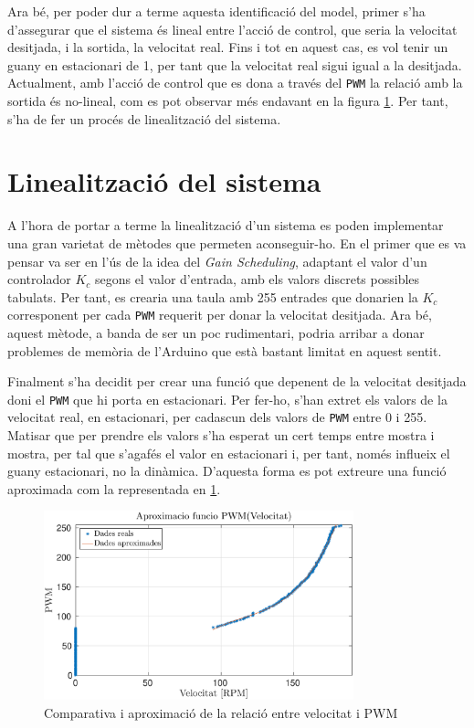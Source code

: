 \documentclass[12pt,a4paper,final,twoside,openright]{report}
\begin{document}
Ara bé, per poder dur a terme aquesta identificació del model, primer s'ha d'assegurar que el sistema és lineal entre l'acció de control, que seria la velocitat desitjada, i la sortida, la velocitat real. Fins i tot en aquest cas, es vol tenir un guany en estacionari de 1, per tant que la velocitat real sigui igual a la desitjada. Actualment, amb l'acció de control que es dona a través del \texttt{PWM} la relació amb la sortida és no-lineal, com es pot observar més endavant en la figura \ref{fig:PWM(vel)}. Per tant, s'ha de fer un procés de linealització del sistema.

\section{Linealització del sistema}

A l'hora de portar a terme la linealització d'un sistema es poden implementar una gran varietat de mètodes que permeten aconseguir-ho. En el primer que es va pensar va ser en l'ús de la idea del \textit{Gain Scheduling}, adaptant el valor d'un controlador $K_c$ segons el valor d'entrada, amb els valors discrets possibles tabulats. Per tant, es crearia una taula amb 255 entrades que donarien la $K_c$ corresponent per cada \texttt{PWM} requerit per donar la velocitat desitjada. Ara bé, aquest mètode, a banda de ser un poc rudimentari, podria arribar a donar problemes de memòria de l'Arduino que està bastant limitat en aquest sentit.

Finalment s'ha decidit per crear una funció que depenent de la velocitat desitjada doni el \texttt{PWM} que hi porta en estacionari. Per fer-ho, s'han extret els valors de la velocitat real, en estacionari, per cadascun dels valors de \texttt{PWM} entre 0 i 255. Matisar que per prendre els valors s'ha esperat un cert temps entre mostra i mostra, per tal que s'agafés el valor en estacionari i, per tant, només influeix el guany estacionari, no la dinàmica. D'aquesta forma es pot extreure una funció aproximada com la representada en \ref{fig:PWM(vel)}.

\begin{figure}[h]
\centering
\includegraphics[width=0.8\textwidth]{Imatges/funcioPWM.eps}
\caption{Comparativa i aproximació de la relació entre velocitat i PWM\label{fig:PWM(vel)}}
\end{figure}
\end{document}
